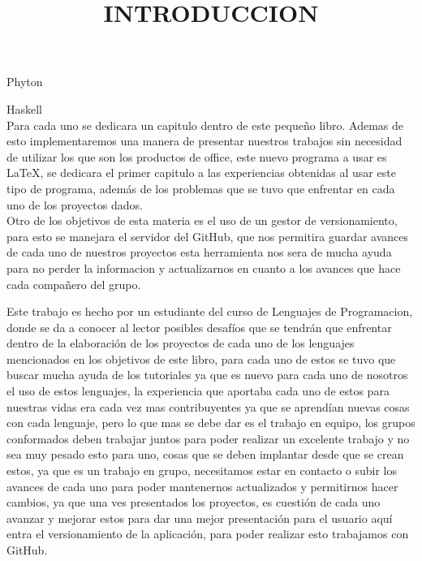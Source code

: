 \documentclass[12pt]{extbook}
\begin{document}
\textbullet{} Phyton 

\textbullet{} Haskell\\

Para cada uno se dedicara un capitulo dentro de este pequeño libro.
Ademas de esto implementaremos una manera de presentar nuestros trabajos
sin necesidad de utilizar los que son los productos de office, este
nuevo programa a usar es \LaTeX, se dedicara el primer
capitulo a las experiencias obtenidas al usar este tipo de programa,
además de los problemas que se tuvo que enfrentar en cada uno de los
proyectos dados.\\ Otro de los objetivos de esta materia es el uso de
un gestor de versionamiento, para esto se manejara el servidor del
GitHub, que nos permitira guardar avances de cada uno de nuestros proyectos
esta herramienta nos sera de mucha ayuda para no perder la informacion y
actualizarnos en cuanto a los avances que hace cada compañero del grupo.


\newpage
\begin{center}
\title{INTRODUCCION}\maketitle
\end{center}


Este trabajo es hecho por un estudiante del curso de Lenguajes de
Programacion, donde se da a conocer al lector posibles desafíos que
se tendrán que enfrentar dentro de la elaboración de los proyectos
de cada uno de los lenguajes mencionados en los objetivos de este
libro, para cada uno de estos se tuvo que buscar mucha ayuda de los
tutoriales ya que es nuevo para cada uno de nosotros el uso de estos
lenguajes, la experiencia que aportaba cada uno de estos para nuestras
vidas era cada vez mas contribuyentes ya que se aprendían nuevas cosas
con cada lenguaje, pero lo que mas se debe dar es el trabajo en equipo,
los grupos conformados deben trabajar juntos para poder realizar un
excelente trabajo y no sea muy pesado esto para uno, cosas que se
deben implantar desde que se crean estos, ya que es un trabajo en
grupo, necesitamos estar en contacto o subir los avances de cada uno
para poder mantenernos actualizados y permitirnos hacer cambios, ya
que una ves presentados los proyectos, es cuestión de cada uno avanzar
y mejorar estos para dar una mejor presentación para el usuario aquí
entra el versionamiento de la aplicación, para poder realizar esto
trabajamos con GitHub. \\
\end{document}
